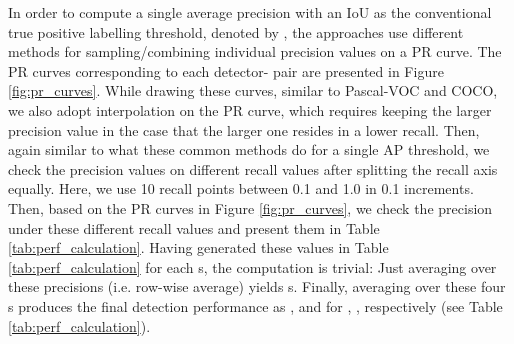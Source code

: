 \documentclass{article}
\begin{document}
In order to compute a single average precision with an IoU as the conventional true positive labelling threshold, denoted by , the approaches use different methods for sampling/combining individual precision values on a PR curve. The PR curves corresponding to each detector- pair are presented in Figure \ref{fig:pr_curves}. While drawing these curves, similar to Pascal-VOC and COCO, we also adopt interpolation on the PR curve, which requires keeping the larger precision value in the case that the larger one resides in a lower recall. Then, again similar to what these common methods do for a single AP threshold, we check the precision values on different recall values after splitting the recall axis equally. Here, we use 10 recall points between 0.1 and 1.0 in 0.1 increments. Then,  based on the PR curves in Figure \ref{fig:pr_curves}, we check the precision under these different recall values and present them in Table \ref{tab:perf_calculation}. Having generated these values in Table \ref{tab:perf_calculation} for each s, the computation is trivial: Just averaging over these precisions (i.e. row-wise average) yields s. Finally, averaging over these four s produces the final detection performance as ,  and  for , ,  respectively (see Table \ref{tab:perf_calculation}). 
\end{document}
